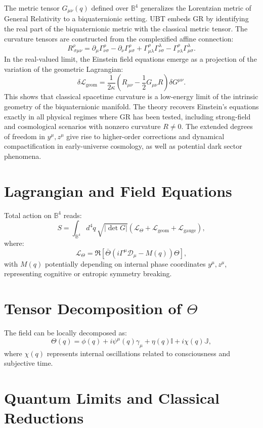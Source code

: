 \documentclass[12pt]{article}
\begin{document}
The metric tensor \( G_{\mu\nu}(q) \) defined over \( \mathbb{B}^4 \) generalizes the Lorentzian metric of General Relativity to a biquaternionic setting. UBT embeds GR by identifying the real part of the biquaternionic metric with the classical metric tensor. The curvature tensors are constructed from the complexified affine connection:
\[
R^\rho_{\ \sigma\mu\nu} = \partial_\mu \Gamma^\rho_{\nu\sigma} - \partial_\nu \Gamma^\rho_{\mu\sigma} + \Gamma^\rho_{\mu\lambda} \Gamma^\lambda_{\nu\sigma} - \Gamma^\rho_{\nu\lambda} \Gamma^\lambda_{\mu\sigma}.
\]
In the real-valued limit, the Einstein field equations emerge as a projection of the variation of the geometric Lagrangian:
\[
\delta \mathcal{L}_{\text{geom}} = \frac{1}{2\kappa} \left( R_{\mu\nu} - \frac{1}{2} G_{\mu\nu} R \right) \delta G^{\mu\nu}.
\]
This shows that classical spacetime curvature is a low-energy limit of the intrinsic geometry of the biquaternionic manifold. The theory recovers Einstein's equations exactly in all physical regimes where GR has been tested, including strong-field and cosmological scenarios with nonzero curvature $R \neq 0$. The extended degrees of freedom in \( y^\mu, z^\mu \) give rise to higher-order corrections and dynamical compactification in early-universe cosmology, as well as potential dark sector phenomena.
\section{Lagrangian and Field Equations}

Total action on \( \mathbb{B}^4 \) reads:
\[
S = \int_{\mathbb{B}^4} d^4q \, \sqrt{|\det G|} \left( \mathcal{L}_{\Theta} + \mathcal{L}_{\text{geom}} + \mathcal{L}_{\text{gauge}} \right),
\]
where:
\[
\mathcal{L}_{\Theta} = \Re\left[ \bar{\Theta} \left( i \Gamma^\mu \mathcal{D}_\mu - M(q) \right) \Theta \right],
\]
with \( M(q) \) potentially depending on internal phase coordinates \( y^\mu, z^\mu \), representing cognitive or entropic symmetry breaking.

\section{Tensor Decomposition of \(\Theta\)}

The field can be locally decomposed as:
\[
\Theta(q) = \phi(q) + i \psi^\mu(q) \gamma_\mu + \eta(q) \mathbb{I} + i \chi(q) \mathbb{J},
\]
where \( \chi(q) \) represents internal oscillations related to consciousness and subjective time.

\section{Quantum Limits and Classical Reductions}
\end{document}
